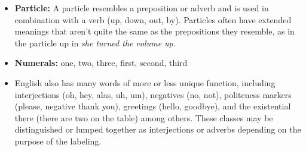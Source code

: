 \documentclass[11pt]{article}
\begin{document}
\begin{itemize}
		\item \textbf{Particle: } A particle resembles a preposition or adverb and is used in combination with a verb (up, down, 
			out, by). Particles often have extended meanings that aren't quite the same as the prepositions they resemble, as 
			in the particle up in \textit{she turned the volume up}.
	
		\item \textbf{Numerals: } one, two, three, first, second, third
		
		\item English also has many words of more or less unique function, including interjections (oh, hey, alas, uh, um), 
		negatives (no, not), politeness markers (please, negative thank you), greetings (hello, goodbye), and the existential 
		there (there are two on the table) among others. These classes may be distinguished or lumped together as 
		interjections or adverbs depending on the purpose of the labeling.

	\end{itemize}
	
\end{document}
